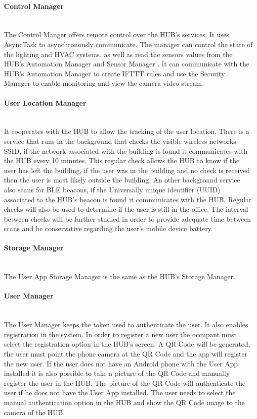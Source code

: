 \paragraph{Control Manager}\mbox{}\\
The Control Manger offers remote control over the HUB's services. It uses AsyncTask to asynchronously communicate. The manager can control the state of the lighting and HVAC systems, as well as read the sensors values from the HUB's Automation Manager and Sensor Manager .
It can communicate with the HUB's Automation Manager to create IFTTT rules and use the Security Manager to enable monitoring and view the camera video stream. 

\paragraph{User Location Manager}\mbox{}\\
It cooperates with the HUB to allow the tracking of the user location. There is a service that runs in the background that checks the visible wireless networks SSID, if the network associated with the building is found it communicates with the HUB every 10 minutes. This regular check allows the HUB to know if the user has left the building, if the user was in the building and no check is received then the user is most likely outside the building. 
An other background service also scans for BLE beacons, if the Universally unique identifier (UUID) associated to the HUB's beacon is found it communicates with the HUB. Regular checks will also be used to determine if the user is still in the office. The interval between checks will be further studied in order to provide adequate time between scans and be conservative regarding the user's mobile device battery.

\paragraph{Storage Manager}\mbox{}\\
The User App Storage Manager is the same as the HUB's Storage Manager.


\paragraph{User Manager}\mbox{}\\
The User Manager keeps the token used to authenticate the user. It also enables registration in the system. In order to register a new user the occupant must select the registration option in the HUB's screen. A QR Code will be generated, the user must point the phone camera at the QR Code and the app will register the new user. If the user does not have an Android phone with the User App installed it is also possible to take a picture of the QR Code and manually register the user in the HUB. The picture of the QR Code will authenticate the user if he does not have the User App installed. The  user needs to select the manual authentication option in the HUB and show the QR Code image to the camera of the HUB.


